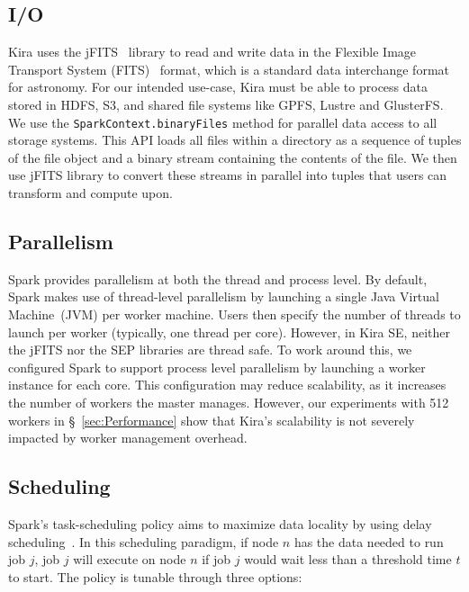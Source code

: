 \documentclass[10pt, conference, compsocconf]{IEEEtran}
\begin{document}
\subsection{I/O}
\label{sec:Design-I/O}
Kira uses the jFITS~\cite{jfits} library to read and write data in the Flexible Image Transport System (FITS)~\cite{wells81} format,
which is a standard data interchange format for astronomy. For our intended use-case, Kira must be
able to process data stored in HDFS, S3, and shared file systems like GPFS, Lustre and GlusterFS.
We use the \texttt{SparkContext.binaryFiles} method for parallel data access to all storage systems.
This API loads all files within a directory as a sequence of tuples of the file object and a binary
stream containing the contents of the file. We then use jFITS library to convert these streams in
parallel into tuples that users can transform and compute upon. 

\subsection{Parallelism}

Spark provides parallelism at both the thread and process level. By default, Spark makes use of
thread-level parallelism by launching a single Java Virtual Machine~(JVM) per worker machine.
Users then specify the number of threads to launch per worker (typically, one thread per core).
However, in Kira SE, neither the jFITS nor the SEP libraries are thread safe. To work around this,
we configured Spark to support process level parallelism by launching a worker instance for each
core. This configuration may reduce scalability,
as it increases the number of workers the master manages. However, our experiments with 512
workers in \S~\ref{sec:Performance} show that Kira's scalability is not severely impacted by
worker management overhead.

\subsection{Scheduling}

Spark's task-scheduling policy aims to maximize data locality by using
delay scheduling~\cite{zaharia10ds}. In this scheduling paradigm, if node $n$ has the data needed
to run job $j$, job $j$ will execute on node $n$ if job $j$ would wait less than a threshold time
$t$ to start. The policy is tunable through three options:
\end{document}
